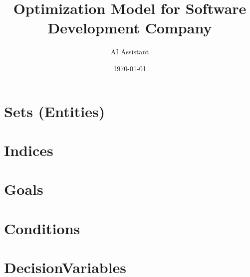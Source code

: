 \documentclass{article}
\title{Optimization Model for Software Development Company}
\author{AI Assistant}
\date{\today}
\begin{document}
\maketitle
\tableofcontents

\section{Sets (Entities)}


\section{Indices}


\section{Goals}


\section{Conditions}


\section{DecisionVariables}

\end{document}

